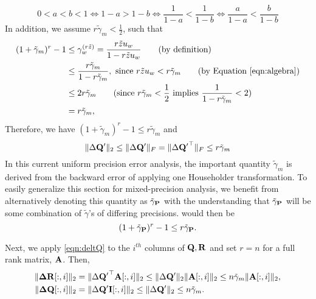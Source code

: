 \begin{equation}
0<a<b<1 \Leftrightarrow 1-a > 1-b \Leftrightarrow \frac{1}{1-a} <\frac{1}{1-b} \Leftrightarrow \frac{a}{1-a} < \frac{b}{1-b}
\label{eqn:algebra}
\end{equation}
In addition, we assume $r\tilde{\gamma}_m< \frac{1}{2}$, such that 
\begin{align}
(1+\tilde{\gamma}_m)^r-1 &\leq \gamma_w^{(r\tilde{z})} = \frac{r\tilde{z}u_w}{1-r\tilde{z}u_w}\qquad\text{(by definition)}\\
&\leq \frac{r\tilde{\gamma}_m}{1-r\tilde{\gamma}_m},\text{ since } r\tilde{z}u_w < r\tilde{\gamma}_m\qquad\text{(by Equation \ref{eqn:algebra})}\\
&\leq 2 r \tilde{\gamma}_m\qquad\text{(since $r\tilde{\gamma}_m< \frac{1}{2}$ implies  $\frac{1}{1-r\tilde{\gamma}_m} < 2$)}\\
&= r\tilde{\gamma}_m, \label{eqn:algebra2}
\end{align}
Therefore, we have $(1+\tilde{\gamma}_m)^r-1 \leq r\tilde{\gamma}_m$ and
\begin{equation}
	 \|\Delta \bb{Q'}\|_2\leq \|\Delta \bb{Q'}\|_F = \|\Delta \bb{Q'}^{\top}\|_F\leq r \tilde{\gamma}_{m} \label{eqn:deltQ}
\end{equation}
In this current uniform precision error analysis, the important quantity $\tilde{\gamma}_{m}$ is derived from the backward error of applying one Householder transformation.
To easily generalize this section for mixed-precision analysis, we benefit from alternatively denoting this quantity as $\tilde{\gamma}_{\mathbf{P}}$ with the understanding that $\tilde{\gamma}_{\mathbf{P}}$ will be some combination of $\tilde{\gamma}$'s of differing precisions. 
 would then be 
\begin{equation}
	(1+\tilde{\gamma}_{\bb{P}})^r-1 \leq r\tilde{\gamma}_{\bb{P}}. \label{eqn:algebra3}
\end{equation}

Next, we apply \cref{eqn:deltQ} to the $i^{th}$ columns of $\mathbf{Q},\mathbf{R}$ and set $r=n$ for a full rank matrix, $\mathbf{A}$.
Then,
\begin{align*}
	\|\mathbf{\Delta R}[:,i]\|_2 &= \|\Delta \mathbf{Q'}^{\top}\mathbf{A}[:,i]\|_2 \leq \|\Delta \mathbf{Q'}\|_2 \|\mathbf{A}[:,i]\|_2  \leq n\tilde{\gamma}_{m} \|\mathbf{A}[:,i]\|_2, \\ 
	\|\mathbf{\Delta Q}[:,i]\|_2 &= \|\Delta \mathbf{Q'}\mathbf{I}[:,i]\|_2 \leq \|\Delta \mathbf{Q'}\|_2\leq n\tilde{\gamma}_{m}.
\end{align*}

